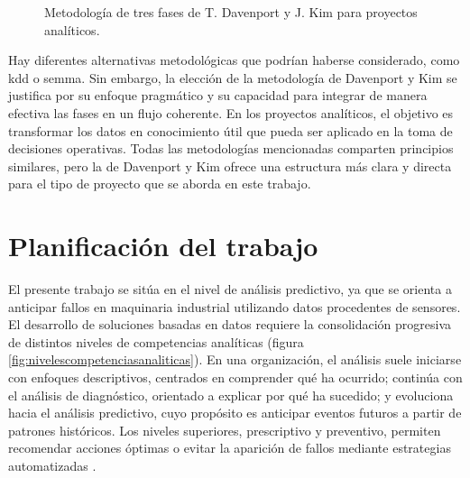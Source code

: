\documentclass[IB]{TFUOC}
\begin{document}
\begin{figure}[H]
  \caption{Metodología de tres fases de T. Davenport y J. Kim para proyectos analíticos.}
  \label{fig:davenport_flechas_forma}
\end{figure}

Hay diferentes alternativas metodológicas que podrían haberse considerado, como \gls{kdd} o \gls{semma}. Sin embargo, la
elección de la metodología de Davenport y Kim se justifica por su enfoque pragmático y su capacidad para integrar de
manera efectiva las fases en un flujo coherente. En los proyectos analíticos, el objetivo es transformar los datos en
conocimiento útil que pueda ser aplicado en la toma de decisiones operativas. Todas las metodologías mencionadas
comparten principios similares, pero la de Davenport y Kim ofrece una estructura más clara y directa para el tipo de
proyecto que se aborda en este trabajo.

\section{Planificación del trabajo}

El presente trabajo se sitúa en el nivel de análisis predictivo, ya que se orienta a anticipar fallos en maquinaria
industrial utilizando datos procedentes de sensores. El desarrollo de soluciones basadas en datos requiere la
consolidación progresiva de distintos niveles de competencias analíticas (figura
\ref{fig:nivelescompetenciasanaliticas}). En una organización, el análisis suele iniciarse con enfoques descriptivos,
centrados en comprender qué ha ocurrido; continúa con el análisis de diagnóstico, orientado a explicar por qué ha
sucedido; y evoluciona hacia el análisis predictivo, cuyo propósito es anticipar eventos futuros a partir de patrones
históricos. Los niveles superiores, prescriptivo y preventivo, permiten recomendar acciones óptimas o evitar la
aparición de fallos mediante estrategias automatizadas \cite{curtodiaz2016organizaciones}.
\end{document}
